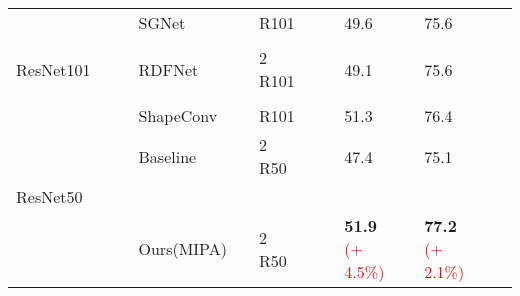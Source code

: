 \documentclass{aims}
\numberwithin{equation}{section}
\begin{document}
\begin{table}[!htb]
\begin{tabular}{lllllllllllll}
    \midrule
          &       &       & SGNet\cite{chen2021spatial} &       &        R101  &       &       & 49.6  &       &        75.6 \\
          &       &       &       &       &       &       &       &       &       &       &         \\
    ResNet101 &       &       & RDFNet &       &        2   R101 &       &       & 49.1  &       &       75.6 \\
          &       &       &       &       &       &       &       &       &       &       &         \\
          &       &       & ShapeConv\cite{cao2021shapeconv} &       &        R101  &       &       & 51.3  &       &        76.4 \\
    \midrule
          &       &       & Baseline &       &        2   R50 &       &       & 47.4  &       &        75.1 \\
    ResNet50 &       &       &       &       &       &       &       &       &       &       &         \\
          &       &       & Ours(MIPA) &       &        2   R50 &       &       & \textbf{51.9} \textcolor{red}{(+ 4.5\%)}&       &        \textbf{77.2} \textcolor{red}{(+ 2.1\%)} \\
    \bottomrule
    \end{tabular}\label{tab:1}\end{table}
\end{document}

